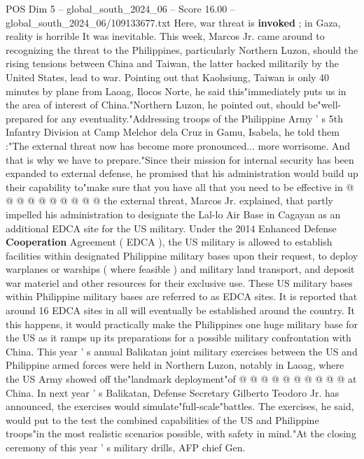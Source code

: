 \begin{textsample}{POS Dim 5 – global\_south\_2024\_06 – Score 16.00 – global\_south\_2024\_06/109133677.txt}  \label{ex:f5_pos_224}
Here, war threat is \textbf{invoked} ; in Gaza, reality is horrible It was inevitable.
This week, Marcos Jr. came around to recognizing the threat to the Philippines, particularly Northern Luzon, should the rising tensions between China and Taiwan, the latter backed militarily by the United States, lead to war.
Pointing out that Kaohsiung, Taiwan is only 40 minutes by plane from Laoag, Ilocos Norte, he said this"immediately puts us in the area of interest of China."Northern Luzon, he pointed out, should be"well-prepared for any eventuality."Addressing troops of the Philippine Army ' s 5th Infantry Division at Camp Melchor dela Cruz in Gamu, Isabela, he told them :"The external threat now has become more pronounced... more worrisome.
And that is why we have to prepare."Since their mission for internal security has been expanded to external defense, he promised that his administration would build up their capability to"make sure that you have all that you need to be effective in @ @ @ @ @ @ @ @ @ @ the external threat, Marcos Jr. explained, that partly impelled his administration to designate the Lal-lo Air Base in Cagayan as an additional EDCA site for the US military.
Under the 2014 Enhanced Defense \textbf{Cooperation} Agreement ( EDCA ), the US military is allowed to establish facilities within designated Philippine military bases upon their request, to deploy warplanes or warships ( where feasible ) and military land transport, and deposit war materiel and other resources for their exclusive use.
These US military bases within Philippine military bases are referred to as EDCA sites.
It is reported that around 16 EDCA sites in all will eventually be established around the country.
It this happens, it would practically make the Philippines one huge military base for the US as it ramps up its preparations for a possible military confrontation with China.
This year ' s annual Balikatan joint military exercises between the US and Philippine armed forces were held in Northern Luzon, notably in Laoag, where the US Army showed off the"landmark deployment"of @ @ @ @ @ @ @ @ @ @ at China.
In next year ' s Balikatan, Defense Secretary Gilberto Teodoro Jr. has announced, the exercises would simulate"full-scale"battles.
The exercises, he said, would put to the test the combined capabilities of the US and Philippine troops"in the most realistic scenarios possible, with safety in mind."At the closing ceremony of this year ' s military drills, AFP chief Gen.

\end{textsample}
